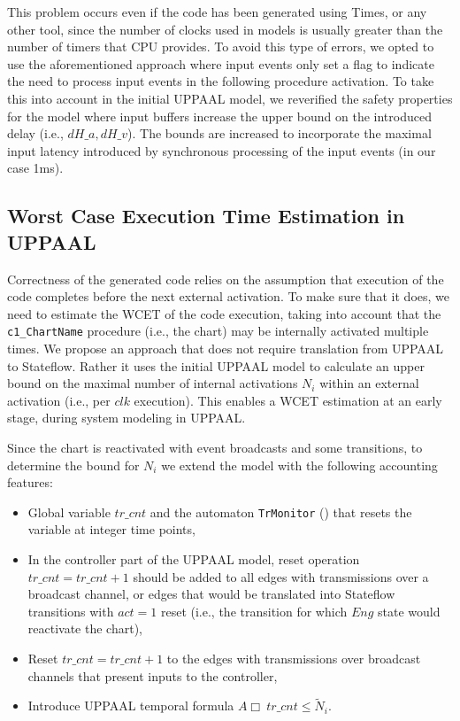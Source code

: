 This problem occurs even if the code has been generated using Times, or any other tool, since the number of clocks used in models is usually greater than the number of timers that CPU provides. To avoid this type of errors, we opted to use the aforementioned approach where input events only set a flag to indicate the need to process input events in the following procedure activation. To take this into account in the initial UPPAAL model, we reverified the safety properties for the model where input buffers increase the upper bound on the introduced delay (i.e., $dH\_a, dH\_v$). The bounds are increased to incorporate the maximal input latency introduced by synchronous processing of the input events (in our case 1ms).


\subsection{Worst Case Execution Time Estimation in UPPAAL}

Correctness of the generated code relies on the assumption that execution of the code completes before the next external activation. To make sure that it does, we need to estimate the WCET of the code execution, taking into account that the \texttt{c1\_ChartName} procedure (i.e., the chart) may be internally activated multiple times. We propose an approach that does not require translation from UPPAAL to Stateflow. Rather it uses the initial UPPAAL model to calculate an upper bound on the maximal number of internal activations $N_i$ within an external activation (i.e., per $clk$ execution). 
This enables a WCET estimation at an early stage, during system modeling in UPPAAL.


Since the chart is reactivated with event broadcasts and some transitions, 
to determine the bound for $N_i$ we extend the model with the following accounting features:
 
\begin{itemize}
\item Global variable $tr\_cnt$ and the automaton \texttt{TrMonitor} () that resets the variable at integer time points,
\item In the controller part of the UPPAAL model, reset operation $tr\_cnt=tr\_cnt+1$ should be added to all edges with transmissions over a broadcast channel, or edges that would be translated into Stateflow transitions with $act=1$ reset (i.e., the transition for which $Eng$ state would reactivate the chart),
\item Reset $tr\_cnt=tr\_cnt+1$ to the edges with transmissions over broadcast channels that present inputs to the controller,
\item Introduce UPPAAL temporal formula $A\Box~tr\_cnt \leq \tilde{N}_i$.
\end{itemize}



